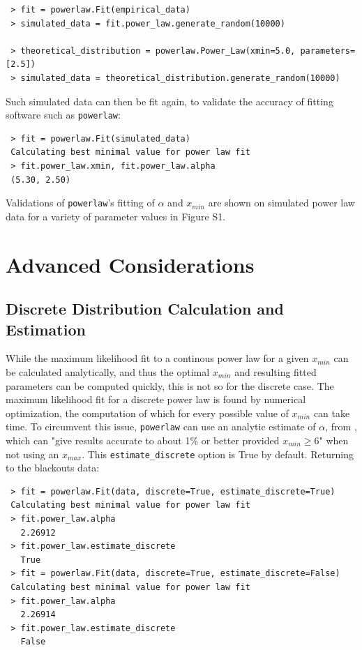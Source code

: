 \documentclass[10pt]{article}
\begin{document}
 \begin{verbatim}
 > fit = powerlaw.Fit(empirical_data)
 > simulated_data = fit.power_law.generate_random(10000)
 
 > theoretical_distribution = powerlaw.Power_Law(xmin=5.0, parameters=[2.5])
 > simulated_data = theoretical_distribution.generate_random(10000)
 \end{verbatim}
 
 Such simulated data can then be fit again, to validate the accuracy of fitting software such as \verb$powerlaw$:
 
 \begin{verbatim}
 > fit = powerlaw.Fit(simulated_data)
 Calculating best minimal value for power law fit
 > fit.power_law.xmin, fit.power_law.alpha
 (5.30, 2.50)
 \end{verbatim}
 
 Validations of \verb$powerlaw$'s fitting of $\alpha$ and $x_{min}$ are shown on simulated power law data for a variety of parameter values in Figure S1.
 
 \section*{Advanced Considerations}
 
 \subsection*{Discrete Distribution Calculation and Estimation}
 While the maximum likelihood fit to a continous power law for a given $x_{min}$ can be calculated analytically, and thus the optimal $x_{min}$ and resulting fitted parameters can be computed quickly, this is not so for the discrete case. The maximum likelihood fit for a discrete power law is found by numerical optimization, the computation of which for every possible value of $x_{min}$ can take time. To circumvent this issue, \verb$powerlaw$ can use an analytic estimate of $\alpha$, from \cite{Clauset2009}, which can "give results accurate to about 1\% or better provided $x_{min} \ge 6$" when not using an $x_{max}$.  This \verb"estimate_discrete" option is True by default. Returning to the blackouts data:
 
 \begin{verbatim}
 > fit = powerlaw.Fit(data, discrete=True, estimate_discrete=True)
 Calculating best minimal value for power law fit
 > fit.power_law.alpha
   2.26912
 > fit.power_law.estimate_discrete
   True
 > fit = powerlaw.Fit(data, discrete=True, estimate_discrete=False)
 Calculating best minimal value for power law fit
 > fit.power_law.alpha
   2.26914
 > fit.power_law.estimate_discrete
   False
 \end{verbatim}
 
\end{document}
